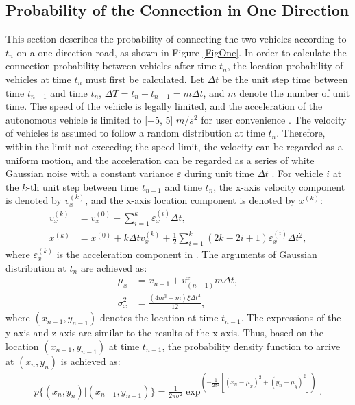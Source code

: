 \documentclass[electronics,aricle,accept,pdftex,moreauthors]{Definitions/mdpi}
\begin{document}
\subsection{Probability of the Connection in One Direction} \label{sec.op1}

This section describes the probability of connecting the two vehicles according to $t_{n}$ on a one-direction road, as shown in Figure \ref{FigOne}. In order to calculate the connection probability between vehicles after time $t_{n}$, the location probability of vehicles at time $t_{n}$ must first be calculated.
Let $\Delta t$ be the unit step time between time $t_{n-1}$ and time $t_{n}$, $\Delta T=t_{n}-t_{n-1}=m\Delta t$, and $m$ denote the number of unit time.
The speed of the vehicle is legally limited, and the acceleration of the autonomous vehicle is limited to [$-$5, 5] $m/s^{2}$ for user convenience \cite{Robert2018, Yen2020}.
The velocity of vehicles is assumed to follow a random distribution at time $t_{n}$.
Therefore, within the limit not exceeding the speed limit, the velocity can be regarded as a uniform motion, and the acceleration can be regarded as a series of white Gaussian noise with a constant variance $\varepsilon$ during unit time $\Delta t$ \cite{jiang2019}.
For vehicle $i$ at the $k$-th unit step between time $t_{n-1}$ and time $t_{n}$, the x-axis velocity component is denoted by $v^{(k)}_{x}$, and the x-axis location component is denoted by $x^{(k)}$:
\begin{align}
    v_{x}^{(k)}&=v_{x}^{(0)}+ \sum\limits_{i=1}^{k}\varepsilon_{x}^{(i)}\Delta t,\\
    x^{(k)}&=x^{(0)}+k \Delta tv_{x}^{(k)}+\frac{1}{2}\sum\limits_{i=1}^{k}(2k-2i+1)\varepsilon_{x}^{(i)}\Delta t^{2},
\end{align}
where $\varepsilon^{(k)}_{x}$ is the acceleration component in \cite{lin2012}.
The arguments of Gaussian distribution at $t_{n}$ are achieved as:
\begin{align}
    \mu_{x}&=x_{n-1}+v_{(n-1)}^{x}m\Delta t,\\
    \sigma_{x}^{2}&=\frac{(4m^{3}-m)\xi\Delta t^{4}}{12},
\end{align}
where $(x_{n-1},y_{n-1})$ denotes the location at time $t_{n-1}$.
The expressions of the y-axis and z-axis are similar to the results of the x-axis.
Thus, based on the location $(x_{n-1},y_{n-1})$ at time $t_{n-1}$, the probability density function to arrive at $(x_{n},y_{n})$ is achieved as:
\begin{equation}
    \begin{split}
        p\{(x_{n}, y_{n})\vert (x_{n-1},y_{n-1})\}=\frac{1}{2\pi\sigma^{2}}\exp^{\left(-\frac{1}{2\sigma^{2}}\left[(x_{n}-\mu_{x})^{2}+(y_{n}-\mu_{y})^{2}\right]\right)}.
    \end{split}
\end{equation}
\end{document}
